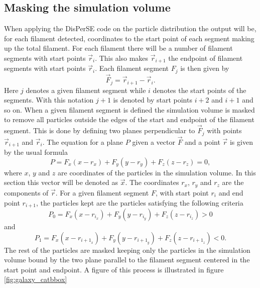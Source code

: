 \subsection{Masking the simulation volume}\label{sec:maskingfilament}
When applying the DisPerSE code on the particle distribution the output will be,
for each filament detected, coordinates to the start point of each segment
making up the total filament. For each filament there will be a number of
filament segments with start points $\vec{r}_i$. This also makes $\vec{r}_{i+1}$
the endpoint of filament segments with start points $\vec{r}_i$. Each filament segment $F_j$ is
then given by
\begin{equation}
    \vec{F}_{j}=\vec{r}_{i+1}-\vec{r}_i.
\end{equation}
Here $j$ denotes a given filament segment while $i$ denotes the start points of the
segments. With this notation $j+1$ is denoted by start points $i+2$ and $i+1$ and
so on. When a given filament segment is defined the simulation volume is masked
to remove all particles outside the edges of the start and endpoint of the
filament segment. This is done by defining  two planes perpendicular to
$\vec{F}_j$ with points $\vec{r}_{i+1}$ and $\vec{r}_i$. The equation for a
plane $P$ given a vector $\vec{F}$ and a point $\vec{r}$ is given
by the usual formula
\begin{equation}\label{eq:plane_mask}
    P=F_x(x-r_x)+F_y(y-r_y)+F_z(z-r_z)=0,
\end{equation}
where $x$, $y$ and $z$ are coordinates of the particles in the simulation
volume. In this section this vector will be denoted as $\vec{x}$.
The coordinates $r_x$, $r_y$ and $r_z$ are the components of $\vec{r}$.
For a given filament segment $F$, with start point $r_{i}$ and end point $r_{i+1}$, the particles kept are the particles
satisfying the following criteria
\begin{equation}
    P_0=F_x(x-r_{i_x})+F_y(y-r_{i_y})+F_z(z-r_{i_z})>0
\end{equation}
and
\begin{equation}
    P_1=F_x(x-r_{{i+1}_x})+F_y(y-r_{{i+1}_y})+F_z(z-r_{{i+1}_z})<0.
\end{equation}
The rest of the particles are masked keeping only the particles in the
simulation volume bound by the two plane parallel to the filament segment
centered in the start point and endpoint. A figure of this process is illustrated in figure \ref{fig:galaxy_catbbox}

